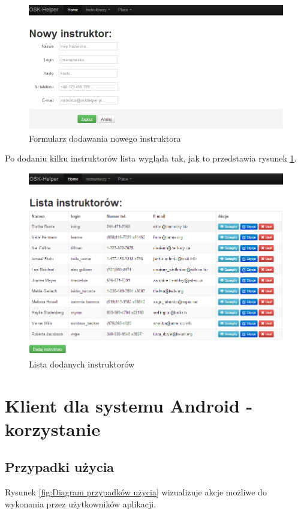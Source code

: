 \documentclass[twoside,a4paper,openright,12pt]{book}
\begin{document}
\begin{figure}[H]
\centering
\includegraphics[width=1\textwidth]{screenshots/panel/nowy_instruktor.png}
\caption{Formularz dodawania nowego instruktora}
\label{fig:Nowy_instruktor}
\end{figure}

\newpage
Po dodaniu kilku instruktorów lista wygląda tak, jak to przedstawia rysunek \ref{fig:Nowy_instruktor}.

\begin{figure}[H]
\centering
\includegraphics[width=1\textwidth]{screenshots/panel/lista_instruktorow.png}
\caption{Lista dodanych instruktorów}
\end{figure}


\chapter{Klient dla systemu Android - korzystanie}

\section{Przypadki użycia}
Rysunek \ref{fig:Diagram przypadków użycia} wizualizuje akcje możliwe do wykonania przez użytkowników aplikacji.
\end{document}
